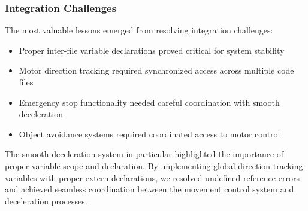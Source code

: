 \documentclass{article}
\begin{document}
\subsubsection{Integration Challenges}
The most valuable lessons emerged from resolving integration challenges:
\begin{itemize}
    \item Proper inter-file variable declarations proved critical for system stability
    \item Motor direction tracking required synchronized access across multiple code files
    \item Emergency stop functionality needed careful coordination with smooth deceleration
    \item Object avoidance systems required coordinated access to motor control
\end{itemize}

The smooth deceleration system in particular highlighted the importance of proper variable scope and declaration. By implementing global direction tracking variables with proper extern declarations, we resolved undefined reference errors and achieved seamless coordination between the movement control system and deceleration processes.
\end{document}
